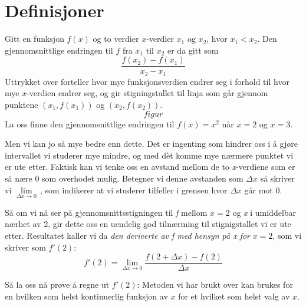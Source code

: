 






\section{Definisjoner \label{grense}}
Gitt en funksjon $ f(x) $ og to verdier $ x $-verdier $ x_1 $ og $ x_2 $, hvor $ {x_1<x_2} $. Den gjennomsnittlige endringen til $ f $ fra $ x_1 $ til $ x_2 $ er da gitt som
\[ \frac{f(x_2)-f(x_1)}{x_2-x_1} \]
Uttrykket over forteller hvor mye funksjonsverdien endrer seg i forhold til hvor mye $ x $-verdien endrer seg, og gir stigningstallet til linja som går gjennom punktene $ (x_1, f(x_1)) $ og $ (x_2, f(x_2)) $.
\[ figur \]
La oss finne den gjennomsnittlige endringen til $ f(x)=x^2 $ når $ x=2 $ og $ x=3 $.  


Men vi kan jo så mye bedre enn dette. Det er ingenting som hindrer oss i å gjøre intervallet vi studerer mye mindre, og med dèt komme mye nærmere punktet vi er ute etter. Faktisk kan vi tenke oss en avstand mellom de to \textit{x}-verdiene som er så nære 0 som overhodet mulig. Betegner vi denne avstanden som $ \Delta x $ så skriver vi $ \lim\limits_{\Delta x \to 0} $\,, som indikerer at vi studerer tilfeller i grensen hvor $ \Delta x $ går mot 0. 

Så om vi nå ser på gjennomsnittsstigningen til \textit{f} mellom $ x=2 $ og \textit{x} i umiddelbar nærhet av 2, gir dette oss en uendelig god tilnærming til stignigstallet vi er ute etter. Resultatet kaller vi da \textit{den deriverte av f med hensyn på x for} $ x=2 $, som vi skriver som $ f'(2) $:
\[f'(2) =\lim\limits_{\Delta x \to 0} \frac{f(2+\Delta x)-f(2)}{\Delta x} \]



Så la oss nå prøve å regne ut $ f'(2) $:
Metoden vi har brukt over kan brukes for en hvilken som helst kontinuerlig funksjon av $ x $ for et hvilket som helst valg av $ x $.


